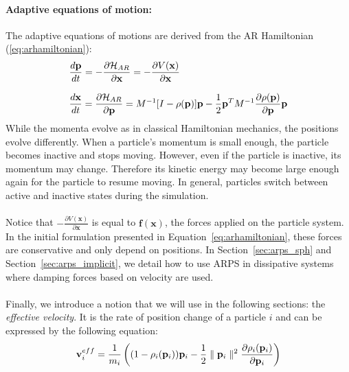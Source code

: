\paragraph*{Adaptive equations of motion:}
The adaptive equations of motions are derived from the AR Hamiltonian (\ref{eq:arhamiltonian}):
\begin{equation}
   \label{eq:armotionequation}
    \displaystyle
    \begin{array}{l}
        \displaystyle \frac{d\mathbf{p}}{dt} =
        -\frac{\partial \mathcal{H}_{AR}}{\partial \mathbf{x}} = -\frac{\partial V(\mathbf{x})}{\partial \mathbf{x}}\\ \\
        \displaystyle \frac{d\mathbf{x}}{dt} =
       \frac{\partial \mathcal{H}_{AR}}{\partial \mathbf{p}} = M^{-1}[I - \rho(\mathbf{p})] \mathbf{p}
        - \frac{1}{2}\mathbf{p}^{T}M^{-1}\frac{\partial \rho(\mathbf{p})}{\partial \mathbf{p}}\mathbf{p}\\
    \end{array}
\end{equation}
While the momenta evolve as in classical Hamiltonian mechanics, the positions evolve differently.
When a particle's momentum is small enough, the particle becomes inactive and stops moving.
However, even if the particle is inactive, its momentum may change.
Therefore its kinetic energy may become large enough again for the particle to resume moving.
In general, particles switch between active and inactive states during the simulation.
\\ \\
Notice that $\displaystyle -\frac{\partial V(\mathbf{x})}{\partial \mathbf{x}}$ is equal to $\mathbf{f}(\mathbf{x})$, the forces applied on the particle system. In the initial formulation presented in Equation~\ref{eq:arhamiltonian}, these forces are conservative and only depend on positions. In Section~\ref{sec:arps_sph} and Section~\ref{sec:arps_implicit}, we detail how to use ARPS in dissipative systems where damping forces based on velocity are used.
\\ \\
Finally, we introduce a notion that we will use in the following sections: the \textit{effective velocity}. It is the rate of position change of a particle $i$ and can be expressed by the following equation:
\begin{equation}
    \label{eq:adaptiveVelocity}
    \mathbf{v}_{i}^{eff} = \frac{1}{m_{i}} \left( (1-\rho_{i}(\mathbf{p}_{i}))\mathbf{p}_{i} - \frac{1}{2} \parallel \mathbf{p}_{i} \parallel^2 \frac{\partial \rho_{i}(\mathbf{p}_{i})}{\partial \mathbf{p}_{i}}\right)
\end{equation}

